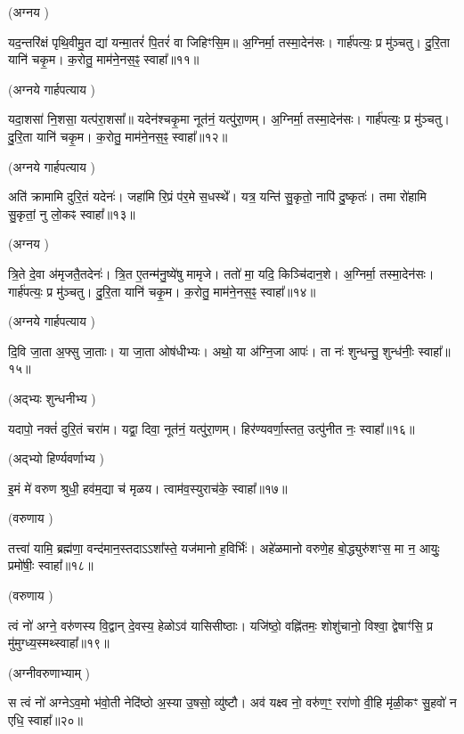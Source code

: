 (अग्नय \idam)


यद॒न्तरि॑क्षं पृथि॒वीमु॒त द्यां यन्मा॒तरं॑ पि॒तरं॑ वा जिहिꣳसि॒म॥
अ॒ग्निर्मा॒ तस्मा॒देन॑सः। गार्\mbox{}ह॑पत्यः॒ प्र मु॑ञ्चतु। 
दु॒रि॒ता यानि॑ चकृ॒म। क॒रोतु॒ माम॑ने॒नस॒ꣴ॒ स्वाहा᳚॥११॥

(अग्नये गार्हपत्याय \idam)



यदा॒शसा॑ नि॒शसा॒ यत्प॑रा॒शसा᳚॥ यदेन॑श्चकृ॒मा नूत॑नं॒ यत्पु॑रा॒णम्।
अ॒ग्निर्मा॒ तस्मा॒देन॑सः। गार्\mbox{}ह॑पत्यः॒ प्र मु॑ञ्चतु। 
दु॒रि॒ता यानि॑ चकृ॒म। क॒रोतु॒ माम॑ने॒नस॒ꣴ॒ स्वाहा᳚॥१२॥

(अग्नये गार्हपत्याय \idam)



अति॑ क्रामामि दुरि॒तं यदेनः॑। जहा॑मि रि॒प्रं प॑र॒मे स॒धस्थे᳚।
यत्र॒ यन्ति॑ सु॒कृतो॒ नापि॑ दु॒ष्कृतः॑।
तमा रो॑हामि सु॒कृतां॒ नु लो॒कꣴ स्वाहा᳚॥१३॥

(अग्नय \idam)

त्रि॒ते दे॒वा अ॑मृजतै॒तदेनः॑।
त्रि॒त ए॒तन्म॑नु॒ष्ये॑षु मामृजे।
ततो॑ मा॒ यदि॒ किञ्चि॑दान॒शे।
अ॒ग्निर्मा॒ तस्मा॒देन॑सः। गार्\mbox{}ह॑पत्यः॒ प्र मु॑ञ्चतु। 
दु॒रि॒ता यानि॑ चकृ॒म। क॒रोतु॒ माम॑ने॒नस॒ꣴ॒ स्वाहा᳚॥१४॥

(अग्नये गार्हपत्याय \idam)

दि॒वि जा॒ता अ॒फ्सु जा॒ताः।
या जा॒ता ओष॑धीभ्यः।
अथो॒ या अ॑ग्नि॒जा आपः॑।
ता नः॑ शुन्धन्तु॒ शुन्ध॑नीः॒ स्वाहा᳚॥१५॥

(अद्भ्यः शुन्धनीभ्य \idam)

यदापो॒ नक्तं॑ दुरि॒तं चरा॑म।
यद्वा॒ दिवा॒ नूत॑नं॒ यत्पु॑रा॒णम्।
हिर॑ण्यवर्णा॒स्तत॒ उत्पु॑नीत नः॒ स्वाहा᳚॥१६॥

(अद्भ्यो हिर्ण्यवर्णाभ्य \idam)


इ॒मं मे॑ वरुण श्रुधी॒ हव॑म॒द्या च॑ मृळय। त्वाम॑व॒स्युराच॑के॒ स्वाहा᳚॥१७॥

(वरुणाय \idam)

तत्त्वा॑ यामि॒ ब्रह्म॑णा॒ वन्द॑मान॒स्तदाऽऽशा᳚स्ते॒ यज॑मानो ह॒विर्भिः॑।
अहे॑ळमानो वरुणे॒ह बो॒द्ध्युरु॑शꣳस॒ मा न॒ आयुः॒ प्रमो॑षीः॒ स्वाहा᳚॥१८॥

(वरुणाय \idam)


त्वं नो॑ अग्ने॒ वरु॑णस्य वि॒द्वान् दे॒वस्य॒ हेळो\-ऽव॑ यासिसीष्ठाः।
यजि॑ष्ठो॒ वह्नि॑तमः॒ शोशु॑चानो॒ विश्वा॒ द्वेषाꣳ॑सि॒ प्र मु॑मुग्ध्य॒स्मथ्स्वाहा᳚॥१९॥

(अग्नीवरुणाभ्याम् \idam)



स त्वं नो॑ अग्ने\-ऽव॒मो भ॑वो॒ती नेदि॑ष्ठो अ॒स्या उ॒षसो॒ व्यु॑ष्टौ।
अव॑ यक्ष्व नो॒ वरु॑ण॒ꣳ॒ ररा॑णो वी॒हि मृ॑ळी॒कꣳ सु॒हवो॑ न एधि॒ स्वाहा᳚॥२०॥

